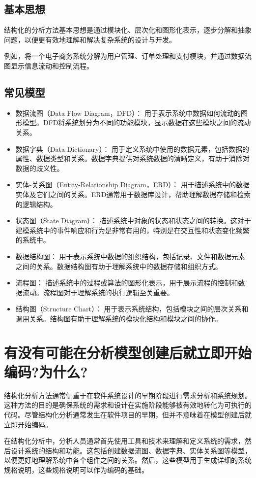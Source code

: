 \documentclass[11pt, a4paper, oneside]{ctexbook}
\begin{document}
\section{基本思想}
结构化的分析方法基本思想是通过模块化、层次化和图形化表示，逐步分解和抽象问题，以便更有效地理解和解决复杂系统的设计与开发。

例如，将一个电子商务系统分解为用户管理、订单处理和支付模块，并通过数据流图显示信息流动和控制流程。
\section{常见模型}
\begin{itemize}
    \item 数据流图（Data Flow Diagram，DFD）： 用于表示系统中数据如何流动的图形模型。DFD将系统划分为不同的功能模块，显示数据在这些模块之间的流动关系。
    \item 数据字典（Data Dictionary）： 用于定义系统中使用的数据元素，包括数据的属性、数据类型和关系。数据字典提供对系统数据的清晰定义，有助于消除对数据的歧义性。
    \item 实体-关系图（Entity-Relationship Diagram，ERD）： 用于描述系统中的数据实体及它们之间的关系。ERD通常用于数据库设计，帮助理解数据存储和检索的逻辑结构。
    \item 状态图（State Diagram）： 描述系统中对象的状态和状态之间的转换。这对于建模系统中的事件响应和行为是非常有用的，特别是在交互性和状态变化频繁的系统中。
    \item 数据结构图： 用于表示系统中数据的组织结构，包括记录、文件和数据元素之间的关系。数据结构图有助于理解系统中的数据存储和组织方式。
    \item 流程图： 描述系统中的过程或算法的图形化表示，用于展示流程的控制和数据流动。流程图对于理解系统的执行逻辑至关重要。
    \item 结构图（Structure Chart）： 用于表示系统结构，包括模块之间的层次关系和调用关系。结构图有助于理解系统的模块化结构和模块之间的协作。
\end{itemize}
\chapter{有没有可能在分析模型创建后就立即开始编码?为什么?}
结构化分析方法通常侧重于在软件系统设计的早期阶段进行需求分析和系统规划。这种方法的目的是确保系统的需求和设计在实施阶段能够被有效地转化为可执行的代码。尽管结构化分析通常发生在软件项目的早期，但并不意味着在模型创建后就立即开始编码。

在结构化分析中，分析人员通常首先使用工具和技术来理解和定义系统的需求，然后设计系统的结构和功能。这包括创建数据流图、数据字典、实体关系图等模型，以便更好地理解系统中各个组件之间的关系。然后，这些模型用于生成详细的系统规格说明，这些规格说明可以作为编码的基础。
\end{document}
